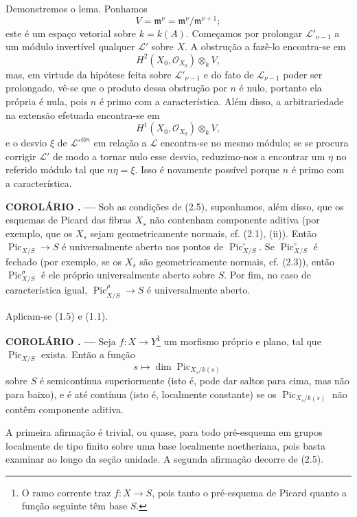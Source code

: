 \documentclass[11pt,twoside,openany]{book}
\numberwithin{equation}{section}
\newcommand{\src}[1]{%
  \phantomsection\hypertarget{src:#1}{}%
  \marginpar{\raggedleft\footnotesize\sffamily #1}%
}
\theoremstyle{plain}
\theoremstyle{definition}
\theoremstyle{remark}
\newcommand{\result}[2]{%
  \par\medskip\noindent\textbf{#1%
  \if\relax\detokenize{#2}\relax\else\space#2\fi. ---}\enspace
}
\newcommand{\FgaUnitKey}{frontmatter}
\renewcommand{\src}[1]{%
  \phantomsection\hypertarget{src:\FgaUnitKey:#1}{}%
  \marginpar{\raggedleft\footnotesize\sffamily #1}%
}
\begin{document}
Demonstremos o lema. Ponhamos
\[
V=\mathfrak m^\nu=\mathfrak m^\nu/\mathfrak m^{\nu+1} ;
\]
este é um espaço vetorial sobre $k=k(A)$. Começamos por prolongar
$\mathcal L'_{\nu-1}$ a um módulo invertível qualquer $\mathcal L'$ sobre $X$.
A obstrução a fazê-lo encontra-se em
\[
H^2(X_0,\mathcal O_{X_0})\otimes_k V,
\]
mas, em virtude da hipótese feita sobre $\mathcal L'_{\nu-1}$ e do fato de
$\mathcal L_{\nu-1}$ poder ser prolongado, vê-se que o produto dessa obstrução
por $n$ é nulo, portanto ela própria é nula, pois $n$ é primo com a
característica. Além disso, a arbitrariedade na extensão efetuada encontra-se
em
\[
H^1(X_0,\mathcal O_{X_0})\otimes_k V,
\]
e o desvio $\xi$ de $\mathcal L'^{\otimes n}$ em relação a $\mathcal L$
encontra-se no mesmo módulo; se se procura corrigir $\mathcal L'$ de modo a
tornar nulo esse desvio, reduzimo-nos a encontrar um $\eta$ no referido módulo
tal que $n\eta=\xi$. Isso é novamente possível porque $n$ é primo com a
característica.

\result{COROLÁRIO}{} Sob as condições de (2.5), suponhamos, além disso, que os
esquemas de Picard das fibras $X_s$ não contenham componente aditiva (por
exemplo, que os $X_s$ sejam geometricamente normais, cf. (2.1), (ii)). Então
$\operatorname{Pic}_{X/S}\longrightarrow S$ é universalmente aberto nos pontos
de $\operatorname{Pic}_{X/S}^\circ$. Se
$\operatorname{Pic}_{X/S}^\circ$ é fechado (por exemplo, se os $X_s$ são
geometricamente normais, cf. (2.3)), então
$\operatorname{Pic}_{X/S}^\sigma$ é ele próprio universalmente aberto sobre
$S$. Por fim, no caso de característica igual,
$\operatorname{Pic}_{X/S}^\rho\longrightarrow S$ é universalmente aberto.

Aplicam-se (1.5) e (1.1).
\src{234}
\result{COROLÁRIO}{2.7} Seja $f:X\longrightarrow Y$\footnote{O ramo corrente
traz $f:X\longrightarrow S$, pois tanto o pré-esquema de Picard quanto a função
seguinte têm base $S$.} um morfismo próprio e plano, tal que
$\operatorname{Pic}_{X/S}$ exista. Então a função
\[
s\longmapsto\dim\operatorname{Pic}_{X_s/k(s)}
\]
sobre $S$ é semicontínua superiormente (isto é, pode dar saltos para cima, mas
não para baixo), e é até contínua (isto é, localmente constante) se os
$\operatorname{Pic}_{X_s/k(s)}$ não contêm componente aditiva.

A primeira afirmação é trivial, ou quase, para todo pré-esquema em grupos
localmente de tipo finito sobre uma base localmente noetheriana, pois basta
examinar ao longo da seção unidade. A segunda afirmação decorre de (2.5).
\end{document}
